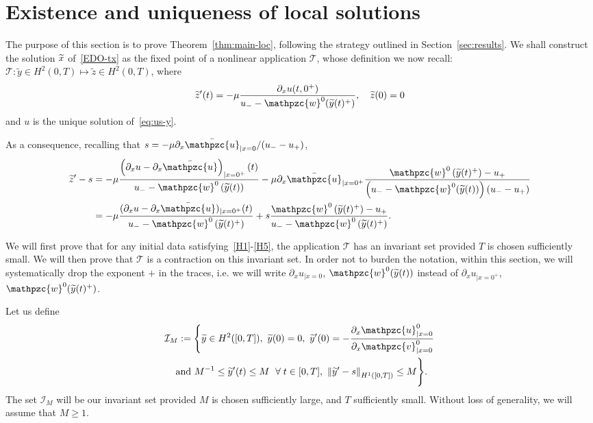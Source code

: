 \documentclass[AHL,Unicode,longabstracts,published]{cedram}
\newcommand{\p}{\partial}
\newcommand{\bu}{\bar{\mathpzc{u}}}
\newcommand{\cT}{\mathcal T}
\newcommand{\cI}{\mathcal I}
\newcommand{\tv}{\mathpzc{v}}
\newcommand{\tu}{\mathpzc{u}}
\newcommand{\tw}{\mathpzc{w}}
\newcommand{\ty}{\widetilde{y}}
\newcommand{\tz}{\widetilde{z}}
\let\oldtilde\tilde
\renewcommand*{\tilde}[1]{\mathchoice{\widetilde{#1}}{\widetilde{#1}}{\oldtilde{#1}}{\oldtilde{#1}}}
\let\oldforall\forall
\renewcommand*{\forall}{\mathrel{\oldforall}}
\begin{document}
\section{Existence and uniqueness of local solutions}\label{sec:local}

The purpose of this section is to prove Theorem~\ref{thm:main-loc}, following the strategy outlined in Section~\ref{sec:results}. We shall construct the solution $\tilde x$ of~\eqref{EDO-tx} as the fixed point of a nonlinear application $\cT$, whose definition we now recall: $\cT: \ty\in H^2(0,T) \mapsto \tz\in H^2(0,T)$, where
\[
\tilde z'(t) =-\mu \frac{ \p_x u(t, 0^+)}{u_- - \tw^0(\tilde y(t)^+)},\quad \tz(0)=0
\]
and $u$ is the unique solution of~\eqref{eq:us-y}.


As a consequence, recalling that $s=-\mu \p_x \bu_{|x=0}/(u_--u_+)$,
\begin{equation}\label{y'-s}
\begin{split}
\tilde z' - s & = -\mu \frac{\left(\p_x u - \p_x \bu\right)_{|x=0^+}(t)}{u_--\tw^0\left(\ty(t)\right)} - \mu \partial_x \bu_{|x=0^+} \dfrac{\tw^0\left(\ty(t)^+\right) - u_+}{\left(u_- - \tw^0(\ty(t))\right) (u_- -u_+)} \\
& = -\mu \frac{(\p_x u - \p_x \bu)_{|x=0^+}(t)}{u_--\tw^0\left(\ty(t)^+\right)} + s \frac{\tw^0\left(\ty(t)^+\right) - u_+}{u_--\tw^0\left(\ty(t)^+\right)}.
\end{split}
\end{equation}



We will first prove that for any initial data satisfying~\eqref{H1}-\eqref{H5}, the application $\cT$ has an invariant set provided $T$ is chosen sufficiently small. We will then prove that $\cT$ is a contraction on this invariant set. {In order not to burden the notation, within this section, we will systematically drop the exponent $+$ in the traces, i.e. we will write $\p_x u_{|x=0}$, $\tw^0(\ty(t))$ instead of $\p_x u_{|x=0^+}$, $\tw^0(\ty(t)^+)$. }


Let us define
\begin{multline*}
\cI_M :=\left\{\ty\in H^2([0,T]),\ \ty(0)=0, \ \ty'(0)=-\frac{\p_x \tu^0_{|x=0}}{\p_x \tv^0_{|x=0}}\right.\\\text{ and } M^{-1} \leq \ty'(t)\leq M \ \forall t\in [0,T],
\ \left\|\ty'-s\right\|_{H^1([0,T])}\leq M\Bigg\}.
\end{multline*}
The set $\cI_M$ will be our invariant set provided $M$ is chosen sufficiently large, and $T$ sufficiently small. Without loss of generality, we will assume that $M \geq 1$.
\end{document}
